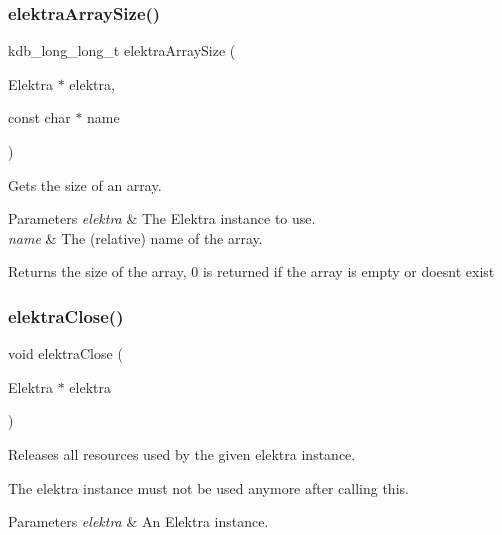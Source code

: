 \subsubsection{\texorpdfstring{elektraArraySize()}{elektraArraySize()}}
{\footnotesize\ttfamily kdb\+\_\+long\+\_\+long\+\_\+t elektra\+Array\+Size (\begin{DoxyParamCaption}\item[{Elektra $\ast$}]{elektra,  }\item[{const char $\ast$}]{name }\end{DoxyParamCaption})}



Gets the size of an array. 


\begin{DoxyParams}{Parameters}
{\em elektra} & The Elektra instance to use. \\
\hline
{\em name} & The (relative) name of the array. \\
\hline
\end{DoxyParams}
\begin{DoxyReturn}{Returns}
the size of the array, 0 is returned if the array is empty or doesn\textquotesingle{}t exist 
\end{DoxyReturn}
\mbox{\label{group__highlevel_ga9b688b7250e5f9d8ea6701cc2cc269af}} 
\subsubsection{\texorpdfstring{elektraClose()}{elektraClose()}}
{\footnotesize\ttfamily void elektra\+Close (\begin{DoxyParamCaption}\item[{Elektra $\ast$}]{elektra }\end{DoxyParamCaption})}



Releases all resources used by the given elektra instance. 

The elektra instance must not be used anymore after calling this. 
\begin{DoxyParams}{Parameters}
{\em elektra} & An Elektra instance. \\
\hline
\end{DoxyParams}
\mbox{\label{group__highlevel_ga22c0775760a9f42f29337c06bf8b2ab5}} 
